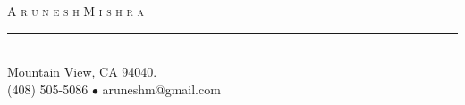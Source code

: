 
\setlength{\topmargin}{-0.6in}  %
\setlength{\textheight}{9.3in}  %
\addtolength{\textwidth}{-0.1in}  %
\setlength{\headrulewidth}{0pt} %
\setlength{\headsep}{0.2in}     %
\setlength{\headheight}{12pt}   %

\newdimen\mylinewidth 
\setlength{\mylinewidth}{\resumewidth}
\addtolength{\mylinewidth}{-0.4in}

\def\bull{\vrule height 0.8ex width .7ex depth -.1ex }
\newcommand{\lineunder}{\vspace*{-8pt} \\ \hspace*{-18pt} \rule{\mylinewidth}{0.5pt} \\}
\newcommand{\justline}{\hspace*{-18pt} \hrulefill \\\vspace{4pt}}
\newcommand{\header}[1]{{\hspace*{-15pt}\vspace*{2pt} \large{\textsc{#1}}} \vspace*{-2pt} \lineunder}
\newcommand{\contact}[3]{
\vspace*{-8pt}
\begin{center}
{\LARGE \scshape {#1}}
\lineunder
#2\\
#3
\end{center}
\vspace*{-8pt}
}

\lhead{\hspace*{-\sectionwidth}} %
\cfoot{}  %
\pagestyle{fancy} %
 
\contact{A r u n e s h \hspace{3mm}    M i s h r a}
{  Mountain View, CA 94040.}
{(408) 505-5086 $\bullet$ aruneshm@gmail.com}
\thispagestyle{empty} %

